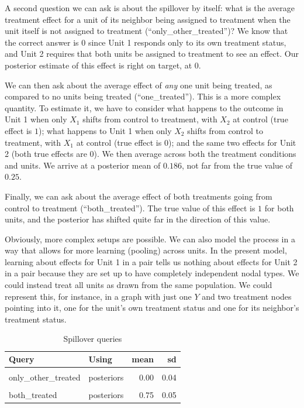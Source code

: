 \documentclass[
  12pt,
]{book}
\begin{document}
A second question we can ask is about the spillover by itself: what is the average treatment effect for a unit of its neighbor being assigned to treatment when the unit itself is not assigned to treatment (``only\_other\_treated'')? We know that the correct answer is \(0\) since Unit 1 responds only to its own treatment status, and Unit 2 requires that both units be assigned to treatment to see an effect. Our posterior estimate of this effect is right on target, at 0.

We can then ask about the average effect of \emph{any} one unit being treated, as compared to no units being treated (``one\_treated''). This is a more complex quantity. To estimate it, we have to consider what happens to the outcome in Unit 1 when only \(X_1\) shifts from control to treatment, with \(X_2\) at control (true effect is \(1\)); what happens to Unit 1 when only \(X_2\) shifts from control to treatment, with \(X_1\) at control (true effect is \(0\)); and the same two effects for Unit 2 (both true effects are \(0\)). We then average across both the treatment conditions and units. We arrive at a posterior mean of \(0.186\), not far from the true value of \(0.25\).

Finally, we can ask about the average effect of both treatments going from control to treatment (``both\_treated''). The true value of this effect is \(1\) for both units, and the posterior has shifted quite far in the direction of this value.

Obviously, more complex setups are possible. We can also model the process in a way that allows for more learning (pooling) across units. In the present model, learning about effects for Unit 1 in a pair tells us nothing about effects for Unit 2 in a pair because they are set up to have completely independent nodal types. We could instead treat all units as drawn from the same population. We could represent this, for instance, in a graph with just one \(Y\) and two treatment nodes pointing into it, one for the unit's own treatment status and one for its neighbor's treatment status.

\begin{table}

\caption{\label{tab:unnamed-chunk-19}Spillover queries}
\centering
\begin{tabular}[t]{llrr}
\toprule
Query & Using & mean & sd\\
\midrule
\cellcolor{gray!6}{only\_self\_treated} & \cellcolor{gray!6}{posteriors} & \cellcolor{gray!6}{0.37} & \cellcolor{gray!6}{0.05}\\
only\_other\_treated & posteriors & 0.00 & 0.04\\
\cellcolor{gray!6}{one\_treated} & \cellcolor{gray!6}{posteriors} & \cellcolor{gray!6}{0.19} & \cellcolor{gray!6}{0.04}\\
both\_treated & posteriors & 0.75 & 0.05\\
\bottomrule
\end{tabular}
\end{table}
\end{document}
